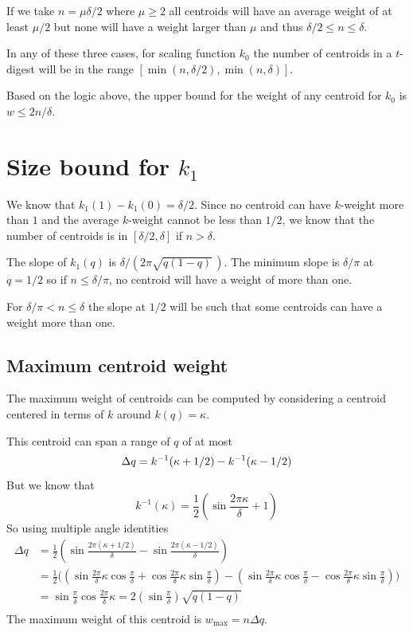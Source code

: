 \documentclass[11pt]{amsart}
\begin{document}
If we take $  n = \mu \delta /2$  where $\mu \ge 2$ all centroids will have an average weight of at least $ \mu/2 $ but none will have a weight larger than $ \mu $ and thus $\delta/2 \le n \le \delta$.

In any of these three cases, for scaling function $k_0$ the number of centroids in a  $t$-digest will be in the range $\left[\min( n,\delta/2), \min(n,\delta)\right]$.

Based on the logic above, the upper bound for the weight of any centroid for $k_0$ is $
w \le 2 n / \delta$. 
\section{Size bound for $k_1$}
We know that $k_1(1) -  k_1(0) = \delta/2$. Since no centroid can have $k$-weight more than $1$ and the average $k$-weight cannot be less than $1/2$, we know that the number of centroids is in $\left[ \delta/2 , \delta \right]$ if $n > \delta$. 

The slope of $k_1(q)$ is $\delta / ( 2\pi \sqrt{q(1-q)} \, )$. The minimum slope is 
$\delta / \pi$ at $q=1/2$ so if $n \le \delta/\pi$, no centroid will have a weight of more than one.

For $\delta/\pi < n \le \delta$ the slope at $1/2$ will be such that some centroids can have a weight more than one.
\subsection{Maximum centroid weight}

The maximum weight of centroids can be computed by considering a centroid centered in terms of $k$ around $k(q) = \kappa$. 

This centroid can span a range of $q$ of at most
\[
\Delta q = k^{-1}(\kappa+1/2) - k^{-1}(\kappa-1/2) \\
\]
But we know that
\[
k^{-1}(\kappa) = \frac 1 2 \left(   \sin \frac {2\pi \kappa} \delta + 1  \right)
\]
So using multiple angle identities
\[
\begin{aligned}
\Delta q &= \frac 1 2 \left(
  { \sin \frac {2\pi (\kappa+1/2)} \delta  }  -   { \sin \frac {2\pi (\kappa-1/2)} \delta  } 
  \right) \\
&= \frac 1 2 \Biggl( 
\left( \sin \frac {2 \pi} \delta \kappa \cos \frac \pi \delta  + \cos \frac {2 \pi} \delta \kappa \sin \frac \pi \delta  \right) -
\left( \sin \frac {2 \pi} \delta \kappa \cos \frac  \pi  \delta  - \cos \frac {2 \pi} \delta \kappa \sin \frac  \pi  \delta  \right) 
\Biggr) \\
&=  
\sin \frac \pi \delta    \cos \frac {2 \pi} \delta \kappa =   2 \left( \sin \frac \pi \delta \right)    \sqrt{q(1-q)}\\
\end{aligned}
\]
The maximum weight of this centroid is  $w_{\max} = n \Delta q$.
\end{document}
